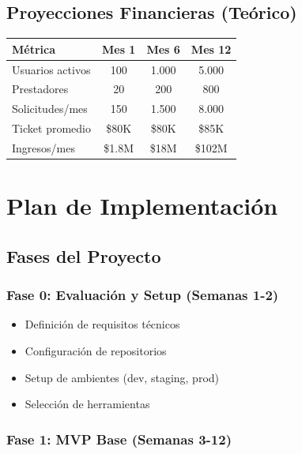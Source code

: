 \documentclass[12pt,a4paper,spanish]{article}
\begin{document}
\subsection{Proyecciones Financieras (Teórico)}

\begin{center}
\begin{tabular}{|l|c|c|c|}
    \toprule
    \textbf{Métrica} & \textbf{Mes 1} & \textbf{Mes 6} & \textbf{Mes 12} \\
    \midrule
    Usuarios activos & 100 & 1.000 & 5.000 \\
    Prestadores & 20 & 200 & 800 \\
    Solicitudes/mes & 150 & 1.500 & 8.000 \\
    Ticket promedio & \$80K & \$80K & \$85K \\
    Ingresos/mes & \$1.8M & \$18M & \$102M \\
    \bottomrule
\end{tabular}
\end{center}

\newpage

\section{Plan de Implementación}

\subsection{Fases del Proyecto}

\subsubsection{Fase 0: Evaluación y Setup (Semanas 1-2)}

\begin{itemize}
    \item Definición de requisitos técnicos
    \item Configuración de repositorios
    \item Setup de ambientes (dev, staging, prod)
    \item Selección de herramientas
\end{itemize}

\subsubsection{Fase 1: MVP Base (Semanas 3-12)}
\end{document}
